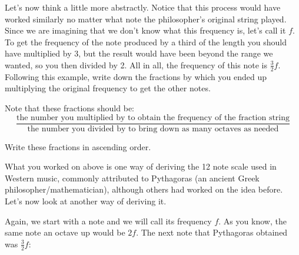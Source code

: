 \documentclass[12pt,noauthor,nooutcomes,hints,instructornotes]{ximera}%
\begin{document}
\begin{question} 
Let's now think a little more abstractly.  Notice that this process would have worked similarly no matter what note the philosopher's original string played. Since we are imagining that we don't know what this frequency is, let's call it $f$. To get the frequency of the note produced by a third of the length you should have multiplied by 3, but the result would have been beyond the range we wanted, so you then divided by 2. All in all, the frequency of this note is $\frac{3}{2}f$. Following this example, write down the fractions by which you ended up multiplying the original frequency to get the other notes.

Note that these fractions should be:
\[
\dfrac{\text{the number you multiplied by to obtain the frequency of the fraction string}}{\text{the number you divided by to bring down as many octaves as needed}}
\]

Write these fractions in ascending order.

\end{question}


What you worked on above is one way of deriving the 12 note scale used in Western music, commonly attributed to Pythagoras (an ancient Greek philosopher/mathematician), although others had worked on the idea before. Let's now look at another way of deriving it.


Again, we start with a note and we will call its frequency $f$. As you know, the same note an octave up would be $2f$. The next note that Pythagoras obtained was $\frac{3}{2}f$:
    

    
\end{document}
